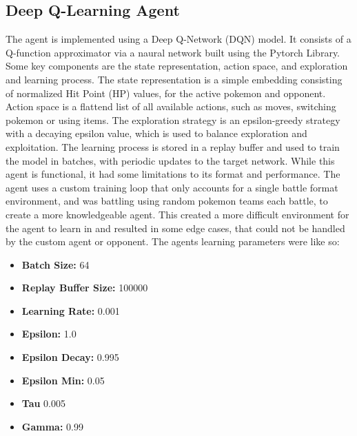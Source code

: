 \subsection{Deep Q-Learning Agent}
The agent is implemented using a Deep Q-Network (DQN) model. It consists of a Q-function
approximator via a naural network built using the Pytorch Library. Some key components 
are the state representation, action space, and exploration and learning process.
The state representation is a simple embedding consisting of normalized Hit Point (HP) values, 
for the active pokemon and opponent. Action space is a flattend list of all available actions, such
as moves, switching pokemon or using items. The exploration strategy is an epsilon-greedy strategy
with a decaying epsilon value, which is used to balance exploration and exploitation.
The learning process is stored in a replay buffer and used to train the model in batches, with 
periodic updates to the target network.
While this agent is functional, it had some limitations to its format and performance. The agent
uses a custom training loop that only accounts for a single battle format environment, and was 
battling using random pokemon teams each battle, to create a more knowledgeable agent. 
This created a more difficult environment for the agent to learn in and resulted in some 
edge cases, that could not be handled by the custom agent or opponent.
The agents learning parameters were like so:
\begin{itemize}
    \item \textbf{Batch Size:} 64
    \item \textbf{Replay Buffer Size:} 100000
    \item \textbf{Learning Rate:} 0.001 
    \item \textbf{Epsilon:} 1.0
    \item \textbf{Epsilon Decay:} 0.995
    \item \textbf{Epsilon Min:} 0.05
    \item \textbf{Tau} 0.005
    \item \textbf{Gamma:} 0.99
\end{itemize}



